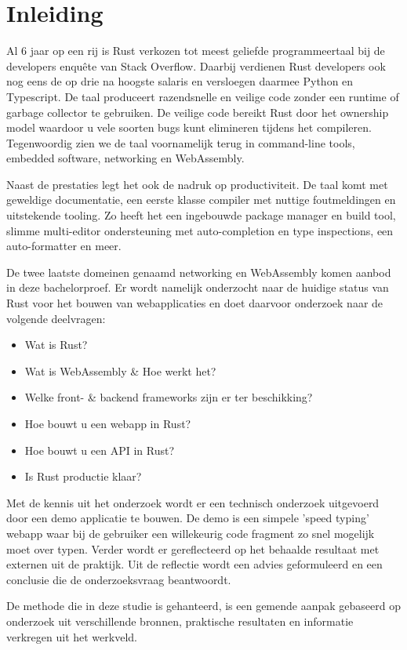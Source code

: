 \chapter{Inleiding}

Al 6 jaar op een rij is Rust verkozen tot meest geliefde programmeertaal bij de developers enquête
van Stack Overflow. Daarbij verdienen Rust developers ook nog eens de op drie na hoogste salaris en
versloegen daarmee Python en Typescript. \cite{so_enquete} De taal produceert razendsnelle en
veilige code zonder een runtime of garbage collector te gebruiken. De veilige code bereikt Rust door
het ownership model waardoor u vele soorten bugs kunt elimineren tijdens het compileren.
Tegenwoordig zien we de taal voornamelijk terug in command-line tools, embedded software, networking
en WebAssembly.


Naast de prestaties legt het ook de nadruk op productiviteit. De taal komt met geweldige
documentatie, een eerste klasse compiler met nuttige foutmeldingen en uitstekende tooling. Zo heeft
het een ingebouwde package manager en build tool, slimme multi-editor ondersteuning met
auto-completion en type inspections, een auto-formatter en meer. \cite{rustlang}

De twee laatste domeinen genaamd networking en WebAssembly komen aanbod in deze bachelorproef. 
Er wordt namelijk onderzocht naar de huidige status van Rust voor het bouwen van webapplicaties en
doet daarvoor onderzoek naar de volgende deelvragen:
\begin{itemize}
  \item Wat is Rust?
  \item Wat is WebAssembly \& Hoe werkt het?
  \item Welke front- \& backend frameworks zijn er ter beschikking?
  \item Hoe bouwt u een webapp in Rust?
  \item Hoe bouwt u een API in Rust?
  \item Is Rust productie klaar?
\end{itemize}

Met de kennis uit het onderzoek wordt er een technisch onderzoek uitgevoerd door een demo applicatie
te bouwen. De demo is een simpele 'speed typing' webapp waar bij de gebruiker een willekeurig code
fragment zo snel mogelijk moet over typen. Verder wordt er gereflecteerd op het behaalde resultaat
met externen uit de praktijk. Uit de reflectie wordt een advies geformuleerd en een conclusie die de
onderzoeksvraag beantwoordt.

De methode die in deze studie is gehanteerd, is een gemende aanpak gebaseerd op onderzoek uit
verschillende bronnen, praktische resultaten en informatie verkregen uit het werkveld.
